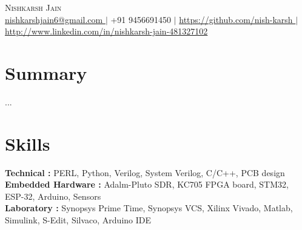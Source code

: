 \documentclass[letterpaper,11pt]{article}
\begin{document}
\begin{center}
    {\Huge \scshape Nishkarsh Jain} \\ \vspace{4pt}
    \small
\href{mailto:nishkarshjain6@gmail.com}{ nishkarshjain6@gmail.com } $|$ +91 9456691450 $|$ \href{ https://github.com/nish-karsh }{ https://github.com/nish-karsh } $|$ \href{ http://www.linkedin.com/in/nishkarsh-jain-481327102 }{ http://www.linkedin.com/in/nishkarsh-jain-481327102 }\end{center}

\section{Summary}
\small{ ... }

\section{Skills}
\begin{itemize}[leftmargin=0.15in, label={}]
  \small{\item{
    \textbf{ Technical :} PERL, Python, Verilog, System Verilog, C/C++, PCB design \\
    \textbf{ Embedded Hardware :} Adalm-Pluto SDR, KC705 FPGA board, STM32, ESP-32, Arduino, Sensors \\
    \textbf{ Laboratory :} Synopsys Prime Time, Synopsys VCS, Xilinx Vivado, Matlab, Simulink, S-Edit, Silvaco, Arduino IDE \\
  }}
\end{itemize}
\end{document}

